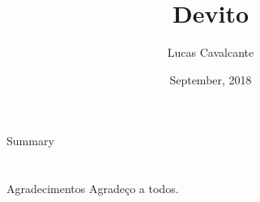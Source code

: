 \documentclass[handout,t]{beamer}
\title[Devito]{
	Devito}
\date{
	September, 2018}
\author[Lucas Cavalcante]{
	Lucas Cavalcante \inst{1}}
\institute[INSTITUTO]{
	\inst{1}%
	\url{lucas@dca.ufrn.br}\\
	\vspace{0.25cm}
	Programa de Pós-Graduação em Engenharia Elétrica e de Computação\\
	Universidade Federal do Rio Grande do Norte}
\begin{document}
\frame{\titlepage}
\section[]{}
\begin{frame}{Summary}
	\tableofcontents
\end{frame}











\section{}
\begin{frame}{Agradecimentos}
	Agradeço a todos. 	
\end{frame}
\end{document}
